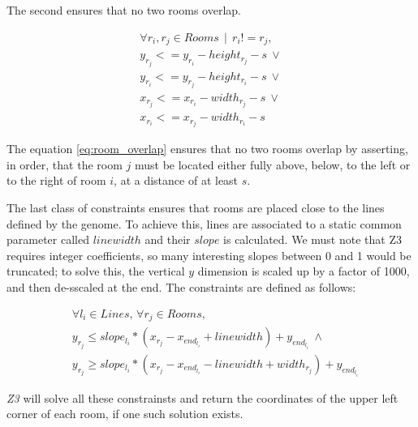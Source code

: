 \documentclass{Configuration_Files/PoliMi3i_thesis}
\begin{document}
The second ensures that no two rooms overlap.

\begin{equation}
\label{eq:room_overlap}
    \begin{split}
        \forall r_i, r_j \in Rooms\, \mid\,  r_i != r_j, \\
        y_{r_j} <= y_{r_i} - height_{r_j} - s\: \lor \\
        y_{r_i} <= y_{r_j} - height_{r_i} - s\: \lor \\
        x_{r_j} <= x_{r_i} - width_{r_j} - s\: \lor \\
        x_{r_i} <= x_{r_j} - width_{r_i} - s
    \end{split}
\end{equation}

The equation \ref{eq:room_overlap} ensures that no two rooms overlap by asserting, in order, that the room $j$ must be located either fully above, below, to the left or to the right of room $i$, at a distance of at least $s$.

The last class of constraints ensures that rooms are placed close to the lines defined by the genome. To achieve this, lines are associated to a static common parameter called $linewidth$ and their $slope$ is calculated. We must note that Z3 requires integer coefficients, so many interesting slopes between 0 and 1 would be truncated; to solve this, the vertical $y$ dimension is scaled up by a factor of 1000, and then de-sscaled at the end. The constraints are defined as follows:

\begin{equation}
\label{eq:room_line}
    \begin{split}
        &\forall l_i \in Lines,\, \forall r_j \in Rooms, \\
        &y_{r_j} \leq slope_{l_i} * (x_{r_j} - x_{end_{l_i}} + linewidth) + y_{end_{l_i}} \:\land \\
        &y_{r_j} \geq slope_{l_i} * (x_{r_j} - x_{end_{l_i}} - linewidth + width_{r_j}) + y_{end_{l_i}}
    \end{split}
\end{equation}

\textit{Z3} will solve all these constrainsts and return the coordinates of the upper left corner of each room, if one such solution exists.
\end{document}
